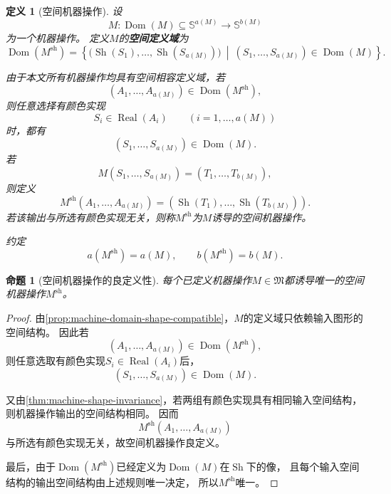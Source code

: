 \documentclass[UTF8,fontset=none]{ctexart}
\theoremstyle{cnthm}
\newtheorem{definition}{定义}[section]
\newtheorem{proposition}{命题}[section]
\begin{document}
			\begin{definition}[空间机器操作]
				设
				$$
				M:\operatorname{Dom}(M)\subseteq\mathbb{S}^{a(M)}
				\longrightarrow
				\mathbb{S}^{b(M)}
				$$
				为一个机器操作。
				定义$M$的\textbf{空间定义域}为
				$$
				\operatorname{Dom}(M^{\mathrm{sh}})
				=
				\left\{
				\bigl(\operatorname{Sh}(S_1),\dots,\operatorname{Sh}(S_{a(M)})\bigr)
				\ \middle|\
				(S_1,\dots,S_{a(M)})\in\operatorname{Dom}(M)
				\right\}.
				$$
				
				由于本文所有机器操作均具有空间相容定义域，若
				$$
				(A_1,\dots,A_{a(M)})\in\operatorname{Dom}(M^{\mathrm{sh}}),
				$$
				则任意选择有颜色实现
				$$
				S_i\in\operatorname{Real}(A_i)
				\qquad(i=1,\dots,a(M))
				$$
				时，都有
				$$
				(S_1,\dots,S_{a(M)})\in\operatorname{Dom}(M).
				$$
				若
				$$
				M(S_1,\dots,S_{a(M)})
				=
				(T_1,\dots,T_{b(M)}),
				$$
				则定义
				$$
				M^{\mathrm{sh}}(A_1,\dots,A_{a(M)})
				=
				(\operatorname{Sh}(T_1),\dots,\operatorname{Sh}(T_{b(M)})).
				$$
				若该输出与所选有颜色实现无关，则称$M^{\mathrm{sh}}$为$M$诱导的空间机器操作。
				
				约定
				$$
				a(M^{\mathrm{sh}})=a(M),
				\qquad
				b(M^{\mathrm{sh}})=b(M).
				$$
			\end{definition}
			
			\begin{proposition}[空间机器操作的良定义性]\label{prop:shape-machine-well-defined}
				每个已定义机器操作$M\in\mathfrak{M}$都诱导唯一的空间机器操作$M^{\mathrm{sh}}$。
			\end{proposition}
			
			\begin{proof}
				由\cref{prop:machine-domain-shape-compatible}，$M$的定义域只依赖输入图形的空间结构。
				因此若
				$$
				(A_1,\dots,A_{a(M)})\in\operatorname{Dom}(M^{\mathrm{sh}}),
				$$
				则任意选取有颜色实现$S_i\in\operatorname{Real}(A_i)$后，
				$$
				(S_1,\dots,S_{a(M)})\in\operatorname{Dom}(M).
				$$
				
				又由\cref{thm:machine-shape-invariance}，若两组有颜色实现具有相同输入空间结构，
				则机器操作输出的空间结构相同。
				因而
				$$
				M^{\mathrm{sh}}(A_1,\dots,A_{a(M)})
				$$
				与所选有颜色实现无关，故空间机器操作良定义。
				
				最后，由于$\operatorname{Dom}(M^{\mathrm{sh}})$已经定义为$\operatorname{Dom}(M)$在$\operatorname{Sh}$下的像，
				且每个输入空间结构的输出空间结构由上述规则唯一决定，
				所以$M^{\mathrm{sh}}$唯一。
			\end{proof}
			
\end{document}
